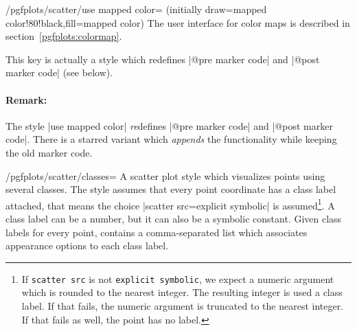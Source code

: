 {\begin{stylekey}{/pgfplots/scatter/use mapped color= (initially draw=mapped color!80!black,fill=mapped color)}
	The user interface for color maps is described in section~\ref{pgfplots:colormap}.
\begin{codeexample}[]
\end{codeexample}

\begin{codeexample}[]
\end{codeexample}

\begin{codeexample}[]
\end{codeexample}
	This key is actually a style which redefines |@pre marker code| and |@post marker code| (see below).

	\paragraph{Remark:} The style |use mapped color| \emph{re}defines |@pre marker code| and |@post marker code|. There is a starred variant  which \emph{appends} the functionality while keeping the old marker code.
\end{stylekey}

\begin{stylekey}{/pgfplots/scatter/classes=}
\label{pgfplots:scatterclasses}
	A scatter plot style which visualizes points using several classes. The style assumes that every point coordinate has a class label attached, that means the choice |scatter src=explicit symbolic| is assumed\footnote{If \texttt{scatter src} is not \texttt{explicit symbolic}, we expect a numeric argument which is rounded to the nearest integer. The resulting integer is used a class label. If that fails, the numeric argument is truncated to the nearest integer. If that fails as well, the point has no label.}. A class label can be a number, but it can also be a symbolic constant. Given class labels for every point,  contains a comma-separated list which associates appearance options to each class label.


\end{stylekey}}
